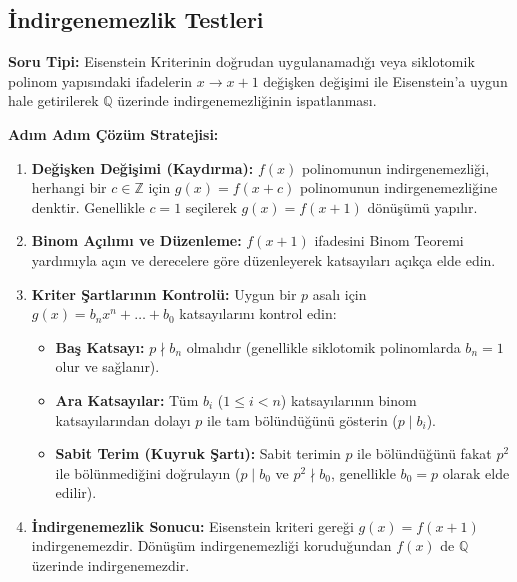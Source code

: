 \documentclass[11pt, a4paper]{article}
\begin{document}
\subsection{İndirgenemezlik Testleri}
\begin{konubox}[title={\faGraduationCap\enspace Soru Tipi ve Adım Adım Çözüm Stratejisi}]
\textbf{Soru Tipi:} Eisenstein Kriterinin doğrudan uygulanamadığı veya siklotomik polinom yapısındaki ifadelerin $x \to x+1$ değişken değişimi ile Eisenstein'a uygun hale getirilerek $\mathbb{Q}$ üzerinde indirgenemezliğinin ispatlanması.

\textbf{Adım Adım Çözüm Stratejisi:}
\begin{enumerate}
    \item \textbf{Değişken Değişimi (Kaydırma):} $f(x)$ polinomunun indirgenemezliği, herhangi bir $c \in \mathbb{Z}$ için $g(x) = f(x+c)$ polinomunun indirgenemezliğine denktir. Genellikle $c = 1$ seçilerek $g(x) = f(x+1)$ dönüşümü yapılır.
    \item \textbf{Binom Açılımı ve Düzenleme:} $f(x+1)$ ifadesini Binom Teoremi yardımıyla açın ve derecelere göre düzenleyerek katsayıları açıkça elde edin.
    \item \textbf{Kriter Şartlarının Kontrolü:} Uygun bir $p$ asalı için $g(x) = b_n x^n + \dots + b_0$ katsayılarını kontrol edin:
    \begin{itemize}
        \item \textbf{Baş Katsayı:} $p \nmid b_n$ olmalıdır (genellikle siklotomik polinomlarda $b_n = 1$ olur ve sağlanır).
        \item \textbf{Ara Katsayılar:} Tüm $b_i$ ($1 \le i < n$) katsayılarının binom katsayılarından dolayı $p$ ile tam bölündüğünü gösterin ($p \mid b_i$).
        \item \textbf{Sabit Terim (Kuyruk Şartı):} Sabit terimin $p$ ile bölündüğünü fakat $p^2$ ile bölünmediğini doğrulayın ($p \mid b_0$ ve $p^2 \nmid b_0$, genellikle $b_0 = p$ olarak elde edilir).
    \end{itemize}
    \item \textbf{İndirgenemezlik Sonucu:} Eisenstein kriteri gereği $g(x) = f(x+1)$ indirgenemezdir. Dönüşüm indirgenemezliği koruduğundan $f(x)$ de $\mathbb{Q}$ üzerinde indirgenemezdir.
\end{enumerate}
\end{konubox}

\newpage
\end{document}
